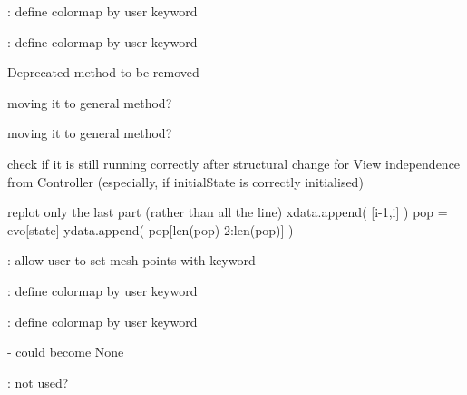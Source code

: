 \begin{DoxyRefList}
\+: define colormap by user keyword 

\+: define colormap by user keyword  
\item[\label{todo__todo000065}%
\Hypertarget{todo__todo000065}%
Global \hyperlink{class_mu_mo_t_1_1_mu_mo_t_1_1_mu_mo_t_s_s_a_view_ac3f09eae4152f838b1693edc4203ee67}{Mu\+Mo\+T\+S\+S\+A\+View.\+\_\+create\+S\+S\+Amatrix} (self)]Deprecated method to be removed  
\item[\label{todo__todo000067}%
\Hypertarget{todo__todo000067}%
Global \hyperlink{class_mu_mo_t_1_1_mu_mo_t_1_1_mu_mo_t_s_s_a_view_a7c4303b3e2a8784a0cc16cd523069203}{Mu\+Mo\+T\+S\+S\+A\+View.\+\_\+rates\+Dict} ]moving it to general method? 

moving it to general method?  
\item[\label{todo__todo000066}%
\Hypertarget{todo__todo000066}%
Global \hyperlink{class_mu_mo_t_1_1_mu_mo_t_1_1_mu_mo_t_s_s_a_view_a51d421aacb4cd83af5f1c2e60c3dff9c}{Mu\+Mo\+T\+S\+S\+A\+View.\+\_\+single\+Run} (self, random\+Seed)]check if it is still running correctly after structural change for View independence from Controller (especially, if initial\+State is correctly initialised)  
\item[\label{todo__todo000070}%
\Hypertarget{todo__todo000070}%
Global \hyperlink{class_mu_mo_t_1_1_mu_mo_t_1_1_mu_mo_t_s_s_a_view_ae8c8d7969b8ab8f31df9d1d1d10eabb9}{Mu\+Mo\+T\+S\+S\+A\+View.\+\_\+visualisation\+Type} ]replot only the last part (rather than all the line) xdata.\+append( \mbox{[}i-\/1,i\mbox{]} ) pop = evo\mbox{[}state\mbox{]} ydata.\+append( pop\mbox{[}len(pop)-\/2\+:len(pop)\mbox{]} )  
\item[\label{todo__todo000042}%
\Hypertarget{todo__todo000042}%
Global \hyperlink{class_mu_mo_t_1_1_mu_mo_t_1_1_mu_mo_tstream_view_ac83a924ad62a2461d65b5c9bf9d27453}{Mu\+Mo\+Tstream\+View.\+\_\+show\+Fixed\+Points} ]\+: allow user to set mesh points with keyword 

\+: define colormap by user keyword 

\+: define colormap by user keyword  
\item[\label{todo__todo000026}%
\Hypertarget{todo__todo000026}%
Global \hyperlink{class_mu_mo_t_1_1_mu_mo_t_1_1_mu_mo_tview_a15f56ca9811d1e67d721fa64f9b0dc1e}{Mu\+Mo\+Tview.\+\_\+controller} ]-\/ could become None  
\item[\label{todo__todo000027}%
\Hypertarget{todo__todo000027}%
Global \hyperlink{class_mu_mo_t_1_1_mu_mo_t_1_1_mu_mo_tview_a590db9d889a22b57be41475d83d4d453}{Mu\+Mo\+Tview.\+\_\+plot\+Limits} ]\+: not used? 
\end{DoxyRefList}